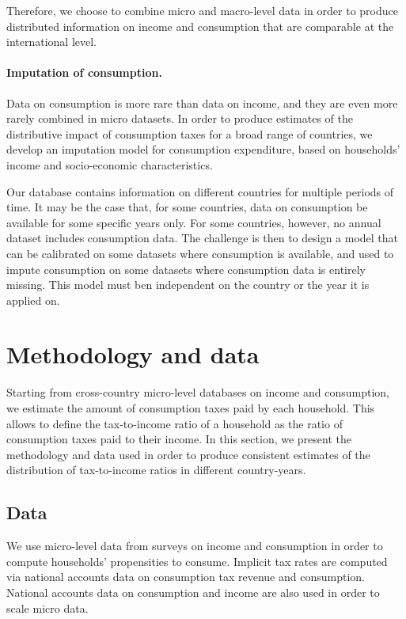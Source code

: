 \documentclass[12pt]{article}
\begin{document}
Therefore, we choose to combine micro and macro-level data in order to produce distributed information on income and consumption that are comparable at the international level.

\paragraph{Imputation of consumption.} Data on consumption is more rare than data on income, and they are even more rarely combined in micro datasets. In order to produce estimates of the distributive impact of consumption taxes for a broad range of countries, we develop an imputation model for consumption expenditure, based on households' income and socio-economic characteristics.

Our database contains information on different countries for multiple periods of time. It may be the case that, for some countries, data on consumption be available for some specific years only. For some countries, however, no annual dataset includes consumption data. The challenge is then to design a model that can be calibrated on some datasets where consumption is available, and used to impute consumption on some datasets where consumption data is entirely missing. This model must ben independent on the country or the year it is applied on.

\section{Methodology and data}

Starting from cross-country micro-level databases on income and consumption, we estimate the amount of consumption taxes paid by each household. This allows to define the tax-to-income ratio of a household as the ratio of consumption taxes paid to their income. In this section, we present the methodology and data used in order to produce consistent estimates of the distribution of tax-to-income ratios in different country-years.

\subsection{Data}

We use micro-level data from surveys on income and consumption in order to compute households' propensities to consume. Implicit tax rates are computed via national accounts data on consumption tax revenue and consumption. National accounts data on consumption and income are also used in order to scale micro data.
\end{document}
